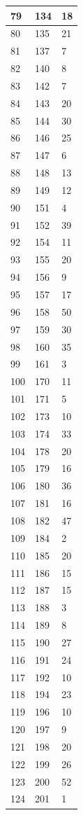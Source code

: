 \begin{tabular}{p{}p{}p{}}
\hline
79 & 134 & 18 \\
\hline
80 & 135 & 21 \\
\hline
81 & 137 & 7 \\
\hline
82 & 140 & 8 \\
\hline
83 & 142 & 7 \\
\hline
84 & 143 & 20 \\
\hline
85 & 144 & 30 \\
\hline
86 & 146 & 25 \\
\hline
87 & 147 & 6 \\
\hline
88 & 148 & 13 \\
\hline
89 & 149 & 12 \\
\hline
90 & 151 & 4 \\
\hline
91 & 152 & 39 \\
\hline
92 & 154 & 11 \\
\hline
93 & 155 & 20 \\
\hline
94 & 156 & 9 \\
\hline
95 & 157 & 17 \\
\hline
96 & 158 & 50 \\
\hline
97 & 159 & 30 \\
\hline
98 & 160 & 35 \\
\hline
99 & 161 & 3 \\
\hline
100 & 170 & 11 \\
\hline
101 & 171 & 5 \\
\hline
102 & 173 & 10 \\
\hline
103 & 174 & 33 \\
\hline
104 & 178 & 20 \\
\hline
105 & 179 & 16 \\
\hline
106 & 180 & 36 \\
\hline
107 & 181 & 16 \\
\hline
108 & 182 & 47 \\
\hline
109 & 184 & 2 \\
\hline
110 & 185 & 20 \\
\hline
111 & 186 & 15 \\
\hline
112 & 187 & 15 \\
\hline
113 & 188 & 3 \\
\hline
114 & 189 & 8 \\
\hline
115 & 190 & 27 \\
\hline
116 & 191 & 24 \\
\hline
117 & 192 & 10 \\
\hline
118 & 194 & 23 \\
\hline
119 & 196 & 10 \\
\hline
120 & 197 & 9 \\
\hline
121 & 198 & 20 \\
\hline
122 & 199 & 26 \\
\hline
123 & 200 & 52 \\
\hline
124 & 201 & 1 \\
\hline
\bottomrule
\end{tabular}

